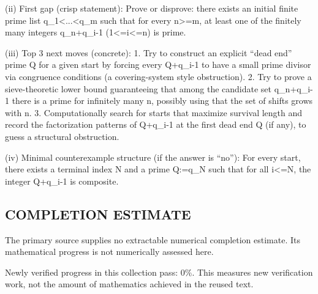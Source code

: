 (ii) First gap (crisp statement):
Prove or disprove: there exists an initial finite prime list q_1<...<q_m such that for every n>=m, at least one of the finitely many integers q_n+q_i-1 (1<=i<=n) is prime.

(iii) Top 3 next moves (concrete):
1. Try to construct an explicit “dead end” prime Q for a given start by forcing every Q+q_i-1 to have a small prime divisor via congruence conditions (a covering-system style obstruction).
2. Try to prove a sieve-theoretic lower bound guaranteeing that among the candidate set {q_n+q_i-1} there is a prime for infinitely many n, possibly using that the set of shifts grows with n.
3. Computationally search for starts that maximize survival length and record the factorization patterns of Q+q_i-1 at the first dead end Q (if any), to guess a structural obstruction.

(iv) Minimal counterexample structure (if the answer is “no”):
For every start, there exists a terminal index N and a prime Q:=q_N such that for all i<=N, the integer Q+q_i-1 is composite.




\subsection*{COMPLETION ESTIMATE}
The primary source supplies no extractable numerical completion estimate. Its mathematical progress is not numerically assessed here.

Newly verified progress in this collection pass: $0\%$. This measures new verification work, not the amount of mathematics achieved in the reused text.
